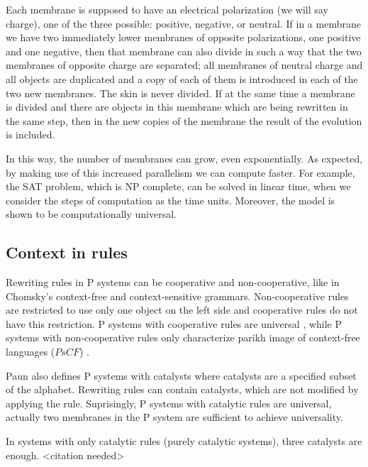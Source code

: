 
Each membrane is supposed to have an electrical polarization (we will say charge), one of the three possible: positive, negative, or neutral. If in a membrane we have two immediately lower membranes of opposite polarizations, one positive and one negative, then that membrane can also divide in such a way that the two membranes of opposite charge are separated; all membranes of neutral charge and all objects are duplicated and a copy of each of them is introduced in each of the two new membranes.
The skin is never divided.
If at the same time a membrane is divided and there are objects in this membrane which are being rewritten in the same step, then in the new copies of the membrane the result of the evolution is included.

In this way, the number of membranes can grow, even exponentially. As expected, by making use of this increased parallelism we can compute faster.
For example, the SAT problem, which is NP complete, can be solved in linear time, when we consider the steps of computation as the time units.
Moreover, the model is shown to be computationally universal.


\subsection{Context in rules} %
\label{sub:context_in_rules}


Rewriting rules in P systems can be cooperative and non-cooperative, like in Chomsky's context-free and context-sensitive grammars. Non-cooperative rules are restricted to use only one object on the left side and cooperative rules do not have this restriction.
P systems with cooperative rules are universal \cite{Paun98}, while P systems with non-cooperative rules only characterize parikh image of context-free languages ($PsCF$) \cite{Sburlan05dragos}.


Paun \cite{Paun98} also defines P systems with catalysts where catalysts are a specified subset of the alphabet. Rewriting rules can contain catalysts, which are not modified by applying the rule. Suprisingly, P systems with catalytic rules are universal, actually two membranes in the P system are sufficient to achieve universality.

In systems with only catalytic rules (purely catalytic systems), three catalysts are enough. <citation needed> %

